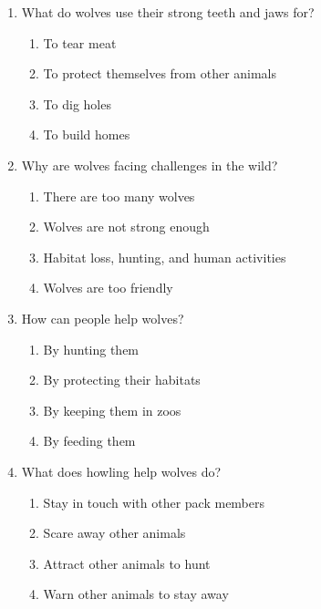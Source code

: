 \documentclass[12pt]{article}
\begin{document}
\begin{enumerate}
    \vspace{0.5cm}

    \item What do wolves use their strong teeth and jaws for?

    \begin{enumerate}[label=\Alph*.]
        \item To tear meat
        \item To protect themselves from other animals
        \item To dig holes
        \item To build homes
    \end{enumerate}

    \vspace{0.5cm}

    \item Why are wolves facing challenges in the wild?

    \begin{enumerate}[label=\Alph*.]
        \item There are too many wolves
        \item Wolves are not strong enough
        \item Habitat loss, hunting, and human activities
        \item Wolves are too friendly
    \end{enumerate}

    \vspace{0.5cm}

    \item How can people help wolves?

    \begin{enumerate}[label=\Alph*.]
        \item By hunting them
        \item By protecting their habitats
        \item By keeping them in zoos
        \item By feeding them
    \end{enumerate}

    \vspace{0.5cm}

    \item What does howling help wolves do?

    \begin{enumerate}[label=\Alph*.]
        \item Stay in touch with other pack members
        \item Scare away other animals
        \item Attract other animals to hunt
        \item Warn other animals to stay away
    \end{enumerate}


\end{enumerate}
\end{document}
